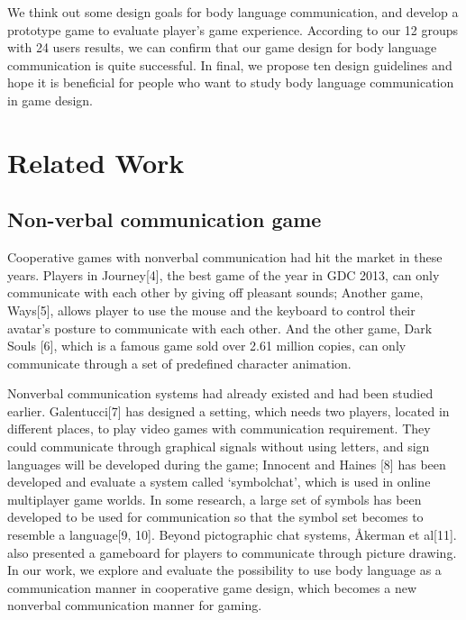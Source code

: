 \documentclass{sigchi}
\begin{document}
We think out some design goals for body language communication, and develop a prototype game to evaluate player's game experience. According to our 12 groups with 24 users results, we can confirm that our game design for body language communication is quite successful. In final, we propose ten design guidelines and hope it is beneficial for people who want to study body language communication in game design. 



\section{Related Work}

\subsection{Non-verbal communication game}

Cooperative games with nonverbal communication had hit the market in these years. Players in Journey[4], the best game of the year in  GDC 2013, can only communicate with each other by giving off pleasant sounds; Another game, Ways[5], allows player to use the mouse and the keyboard to control their avatar’s posture to communicate with each other. And the other game, Dark Souls [6], which is a famous game sold over 2.61 million copies, can only communicate through a set of predefined character animation.

Nonverbal communication systems had already existed and had been studied earlier. 
Galentucci[7] has designed a setting, which needs two players, located in different places, to play video games with communication requirement.
They could communicate through graphical signals without using letters, and sign languages will be developed during the game; 
Innocent and Haines [8] has been developed and evaluate a system called ‘symbolchat’, which is used in online multiplayer game worlds. In some research, a large set of symbols has been developed to be used for communication so that the symbol set becomes to resemble a language[9, 10]. Beyond pictographic chat systems, Åkerman et al[11]. also presented a gameboard for players to communicate through picture drawing. In our work, we explore and evaluate the possibility to use body language as a communication manner in cooperative game design, which becomes a new nonverbal communication manner for gaming.
\end{document}
